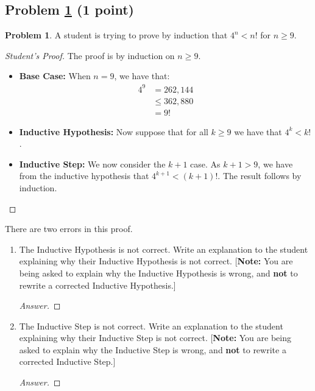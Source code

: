 \documentclass[11pt]{article}
\theoremstyle{definition}
\theoremstyle{definition}
\newtheorem{required}{Problem}
\theoremstyle{definition}
\begin{document}
\subsection{Problem \ref{Induction1} (1 point)}
\begin{required} \label{Induction1}
A student is trying to prove by induction that $4^{n} < n!$ for $n \geq 9$. 

\begin{proof}[Student's Proof]
The proof is by induction on $n \geq 9$. 
\begin{itemize}
\item \textbf{Base Case:} When $n = 9$, we have that:
\begin{align*}
4^{9} &= 262,144 \\
&\leq 362,880 \\
&= 9!
\end{align*}

\item \textbf{Inductive Hypothesis:} Now suppose that for all $k \geq 9$ we have that $4^{k} < k!$. 

\item \textbf{Inductive Step:} We now consider the $k+1$ case. As $k+1 > 9$, we have from the inductive hypothesis that $4^{k+1} < (k+1)!$. The result follows by induction.
\end{itemize}
\end{proof}

There are two errors in this proof. 
\begin{enumerate}[label=(\alph*)]
\item The Inductive Hypothesis is not correct. Write an explanation to the student explaining why their Inductive Hypothesis is not correct. [\textbf{Note:} You are being asked to explain why the Inductive Hypothesis is wrong, and \textbf{not} to rewrite a corrected Inductive Hypothesis.]


\begin{proof}[Answer]
\end{proof}



\vskip 15pt
\item The Inductive Step is not correct. Write an explanation to the student explaining why their Inductive Step is not correct. [\textbf{Note:} You are being asked to explain why the Inductive Step is wrong, and \textbf{not} to rewrite a corrected Inductive Step.]

\begin{proof}[Answer]
\end{proof}
\end{enumerate}
\end{required}
\end{document}
